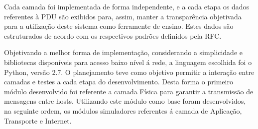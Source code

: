 Cada camada foi implementada de forma independente, e a cada etapa os dados referentes à PDU são exibidos para, assim, manter a transparência objetivada para a utilização deste sistema como ferramente de ensino. Estes dados são estruturados de acordo com os respectivos padrões definidos pela RFC.

Objetivando a melhor forma de implementação, considerando a simplicidade e bibliotecas disponíveis para acesso baixo n\'ivel \'a rede, a linguagem escolhida foi o Python, vers\~ao 2.7. O planejamento teve como objetivo permitir a interaç\~ao entre camadas e testes a cada etapa do desenvolvimento. Desta forma o primeiro m\'odulo desenvolvido foi referente a camada F\'isica para garantir a transmiss\~ao de mensagens entre hosts. Utilizando este m\'odulo como base foram desenvolvidos, na seguinte ordem, os m\'odulos simuladores referentes \'a camada de Aplicaç\~ao, Transporte e Internet.
